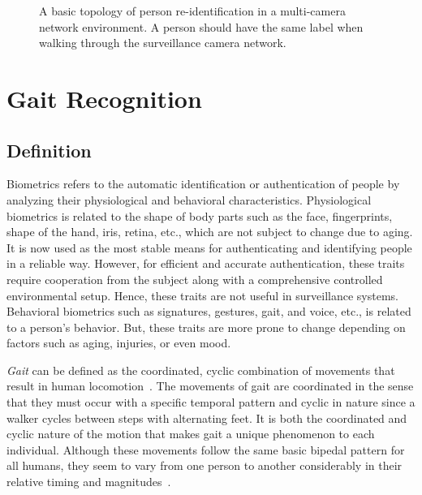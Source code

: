 \begin{figure}
	\caption[A basic topology of person re-identification in a multi-camera network environment]
	{A basic topology of person re-identification in a multi-camera network environment. A person should have the same label when walking through the surveillance camera network. \label{fig:person_reid}}
\end{figure}


\section{Gait Recognition}
\subsection{Definition}
Biometrics refers to the automatic identification or authentication of people by analyzing their physiological and behavioral characteristics. Physiological biometrics is related to the shape of body parts such as the face, fingerprints, shape of the hand, iris, retina, etc., which are not subject to change due to aging. It is now used as the most stable means for authenticating and identifying people in a reliable way. However, for efficient and accurate authentication, these traits require cooperation from the subject along with a comprehensive controlled environmental setup. Hence, these traits are not useful in surveillance systems. Behavioral biometrics such as signatures, gestures, gait, and voice, etc., is related to a person’s behavior. But, these traits are more prone to change depending on factors such as aging, injuries, or even mood. 

\textit{Gait} can be defined as the coordinated, cyclic combination of movements that result in human locomotion~\cite{Boyd_05}. The movements of gait are coordinated in the sense that they must occur with a specific temporal pattern and cyclic in nature since a walker cycles between steps with alternating feet. It is both the coordinated and cyclic nature of the motion that makes gait a unique phenomenon to each individual. Although these movements follow the same basic bipedal pattern for all humans, they seem to vary from one person to another considerably in their relative timing and magnitudes~\cite{Benabdelkader_02}.

